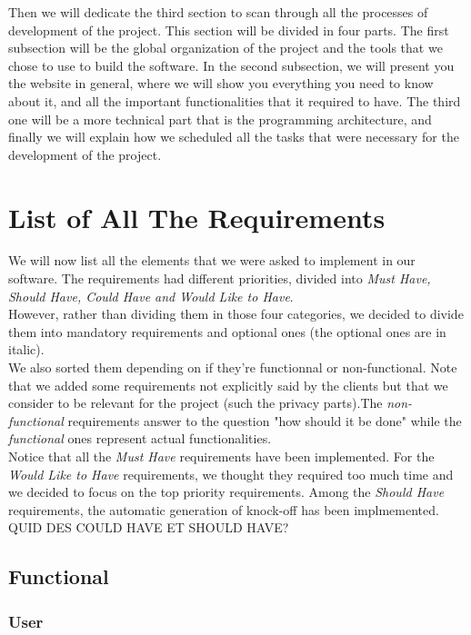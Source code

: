 \documentclass[a4paper, 12pt]{article}
\begin{document}
Then we will dedicate the third section to scan through all the processes of development of the project. This section will be divided in four parts. The first subsection will be the global organization of the project and the tools that we chose to use to build the software. In the second subsection, we will present you the website in general, where we will show you everything you need to know about it, and all the important functionalities that it required to have. The third one will be a more technical part that is the programming architecture, and finally we will explain how we scheduled all the tasks that were necessary for the development of the project.\\

\newpage
\section{List of All The Requirements}
We will now list all the elements that we were asked to implement in our software. The requirements had different priorities, divided into \textit{Must Have, Should Have, Could Have and Would Like to Have}. \\

However, rather than dividing them in those four categories, we decided to divide them into mandatory requirements and optional ones (the optional ones are in italic). \\

We also sorted  them depending on if they're functionnal or non-functional. Note that we added some requirements not explicitly said by the clients but that we consider to be relevant for the project (such the privacy parts).The \textit{non-functional} requirements answer to the question "how should it be done" while the \textit{functional} ones represent actual functionalities.\\

Notice that all the \textit{Must Have} requirements have been implemented. For the \textit{Would Like to Have} requirements, we thought they required too much time and we decided to focus on the top priority requirements. Among the \textit{Should Have} requirements, the automatic generation of knock-off has been implmemented. QUID DES COULD HAVE ET SHOULD HAVE?\\
\subsection*{Functional}

\subsubsection*{User}
	
\end{document}
